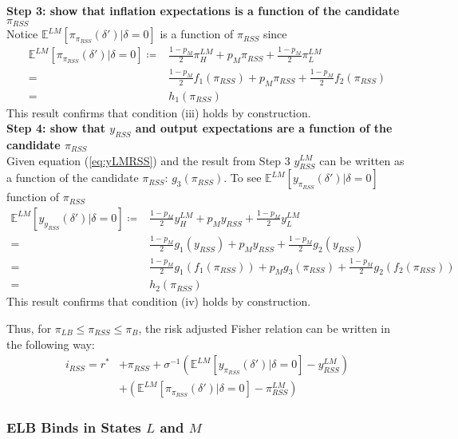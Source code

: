 \documentclass[11pt]{article}
\begin{document}
\begin{singlespace}
\begin{align}
		\end{align}
		\\
		\noindent \textbf{Step 3: show that inflation expectations is a function of the candidate $\pi_{RSS}$}\\
		Notice $\mathbb{E}^{LM}[\pi_{\pi_{RSS}}(\delta')|\delta=0]$ is a function of $\pi_{RSS}$ since 
		\begin{align*}
		\mathbb{E}^{LM}[\pi_{\pi_{RSS}}(\delta')|\delta=0] \coloneqq& \frac{1-p_M}{2}\pi^{LM}_H + p_{M}\pi_{RSS} + \frac{1-p_M}{2}\pi^{LM}_L \\
		=& \frac{1-p_M}{2}f_1(\pi_{RSS}) + p_{M}\pi_{RSS} +  \frac{1-p_M}{2}f_2(\pi_{RSS}) \\
		=& h_1(\pi_{RSS})
		\end{align*}
		This result confirms that condition (iii) holds by construction. 		
		\\
		\noindent \textbf{Step 4: show that  $y_{RSS}$ and output expectations are a function of the candidate $\pi_{RSS}$}\\
		Given equation (\ref{eq:yLMRSS}) and the result from Step 3 $y^{LM}_{RSS}$ can be written as a function of the candidate $\pi_{RSS}$: $g_3(\pi_{RSS})$. To see $\mathbb{E}^{LM}[y_{\pi_{RSS}}(\delta')|\delta=0]$ function of $\pi_{RSS}$ 
		\begin{align*}
		\mathbb{E}^{LM}[y_{y_{RSS}}(\delta')|\delta=0] \coloneqq& \frac{1-p_M}{2}y^{LM}_H + p_{M}y_{RSS} + \frac{1-p_M}{2}y^{LM}_L \\
		=& \frac{1-p_M}{2}g_1(y_{RSS}) + p_{M}y_{RSS} +  \frac{1-p_M}{2}g_2(y_{RSS}) \\
		=& \frac{1-p_M}{2}g_1(f_1(\pi_{RSS})) + p_{M}g_3(\pi_{RSS}) +  \frac{1-p_M}{2}g_2(f_2(\pi_{RSS})) \\
		=& h_2(\pi_{RSS})
		\end{align*}
		This result confirms that condition (iv) holds by construction. 
		
		Thus, for $\pi_{LB} \le \pi_{RSS} \le \pi_B$, the risk adjusted Fisher relation can be written in the following way:
		\begin{align}
		i_{RSS} = r^* &+ \pi_{RSS} + \sigma^{-1}\left(\mathbb{E}^{LM}[y_{\pi_{RSS}}(\delta')|\delta=0] - y_{RSS}^{LM}\right) \nonumber \\
		&+ \left(\mathbb{E}^{LM}[\pi_{\pi_{RSS}}(\delta')|\delta=0] - \pi_{RSS}^{LM}\right)
		\end{align}
		
		\subsubsection{ELB Binds in States $L$ and $M$}
		

\end{singlespace}
\end{document}
